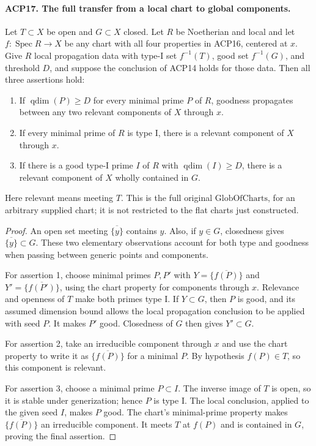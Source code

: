 \paragraph{ACP17. The full transfer from a local chart to global components.}
\label{claim:ACP17}
Let \(T\subset X\) be open and \(G\subset X\) closed.
Let \(R\) be Noetherian and local and let
\(f:\operatorname{Spec}R\to X\) be any chart with all four
properties in ACP16, centered at \(x\).  Give \(R\) local
propagation data with type-I set \(f^{-1}(T)\), good set
\(f^{-1}(G)\), and threshold \(D\), and suppose the conclusion
of ACP14 holds for those data.  Then all three assertions hold:
\begin{enumerate}
\item If \(\operatorname{qdim}(P)\ge D\) for every minimal
      prime \(P\) of \(R\), goodness propagates between any
      two relevant components of \(X\) through \(x\).
\item If every minimal prime of \(R\) is type I, there is
      a relevant component of \(X\) through \(x\).
\item If there is a good type-I prime \(I\) of \(R\) with
      \(\operatorname{qdim}(I)\ge D\), there is a relevant
      component of \(X\) wholly contained in \(G\).
\end{enumerate}
Here relevant means meeting \(T\).  This is the full original
\(\mathrm{GlobOfCharts}\), for an arbitrary supplied chart;
it is not restricted to the flat charts just constructed.

\begin{proof}
An open set meeting \(\overline{\{y\}}\) contains \(y\).
Also, if \(y\in G\), closedness gives
\(\overline{\{y\}}\subset G\).
These two elementary observations account for both type and
goodness when passing between generic points and components.

For assertion 1, choose minimal primes \(P,P'\) with
\(Y=\overline{\{f(P)\}}\) and
\(Y'=\overline{\{f(P')\}}\), using the chart property for
components through \(x\).  Relevance and openness of \(T\)
make both primes type I.  If \(Y\subset G\), then \(P\)
is good, and its assumed dimension bound allows the local
propagation conclusion to be applied with seed \(P\).
It makes \(P'\) good.  Closedness of \(G\) then gives
\(Y'\subset G\).

For assertion 2, take an irreducible component through \(x\)
and use the chart property to write it as
\(\overline{\{f(P)\}}\) for a minimal \(P\).
By hypothesis \(f(P)\in T\), so this component is relevant.

For assertion 3, choose a minimal prime \(P\subset I\).
The inverse image of \(T\) is open, so it is stable under
generization; hence \(P\) is type I.  The local conclusion,
applied to the given seed \(I\), makes \(P\) good.
The chart's minimal-prime property makes
\(\overline{\{f(P)\}}\) an irreducible component.
It meets \(T\) at \(f(P)\) and is contained in \(G\),
proving the final assertion.
\end{proof}


